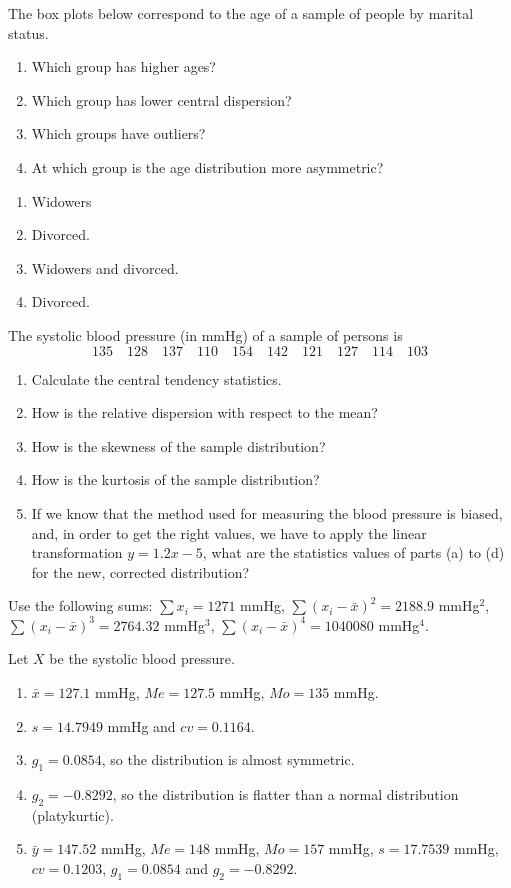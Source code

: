 {The box plots below correspond to the age of a sample of people by marital status.
\begin{center}
\resizebox{0.6\textwidth}{!}{}
\end{center}

\begin{enumerate}
\item Which group has higher ages?
\item Which group has lower central dispersion?
\item Which groups have outliers?
\item At which group is the age distribution more asymmetric?
\end{enumerate}
}
{
\begin{enumerate}
\item Widowers
\item Divorced.
\item Widowers and divorced.
\item Divorced.
\end{enumerate}
}
{
}


{The systolic blood pressure (in mmHg) of a sample of persons is
\[
135\quad 128\quad 137\quad 110\quad 154\quad 142\quad 121\quad 127\quad 114\quad 103
\]

\begin{enumerate}
\item Calculate the central tendency statistics.
\item How is the relative dispersion with respect to the mean?
\item How is the skewness of the sample distribution?
\item How is the kurtosis of the sample distribution?
\item If we know that the method used for measuring the blood pressure is biased, and, in order to get the right values,
we have to apply the linear transformation $y=1.2x-5$, what are the statistics values of parts (a) to (d) for the new, corrected distribution?
\end{enumerate}


Use the following sums: $\sum x_i= 1271$ mmHg, $\sum (x_i-\bar x)^2=2188.9$ mmHg$^2$, $\sum (x_i-\bar x)^3=2764.32$
mmHg$^3$, $\sum (x_i-\bar x)^4=1040080$ mmHg$^4$.
}
{
Let $X$ be the systolic blood pressure.
\begin{enumerate}
\item $\bar{x}=127.1$ mmHg, $Me=127.5$ mmHg, $Mo=135$ mmHg.
\item $s=14.7949$ mmHg and $cv=0.1164$.
\item $g_1=0.0854$, so the distribution is almost symmetric.
\item $g_2=-0.8292$, so the distribution is flatter than a normal distribution (platykurtic).
\item $\bar{y}=147.52$ mmHg, $Me=148$ mmHg, $Mo=157$ mmHg, $s=17.7539$ mmHg, $cv=0.1203$, $g_1=0.0854$ and $g_2=-0.8292$.
\end{enumerate}
}
{
}

